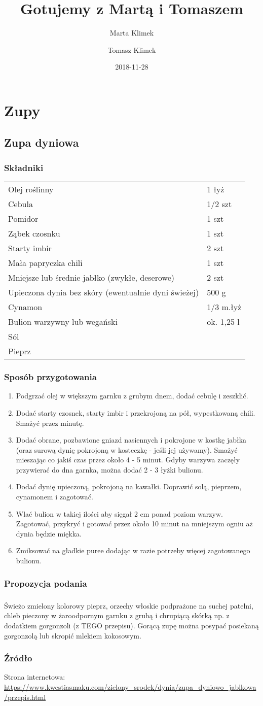 \documentclass{book}
\title{Gotujemy z Martą i Tomaszem}
\date{2018-11-28}
\author{
	Marta Klimek
	\and
	Tomasz Klimek
}
\newcommand{\skladniki}[1]{\subsection*{Składniki}
	\begin{tabular}{ll}
		#1
	\end{tabular}
}
\newcommand{\skladnik}[3]{#3&#1 #2\\}
\newcommand{\sztuk}[2]{\skladnik{#1}{szt}{#2}}
\newcommand{\gram}[2]{\skladnik{#1}{g}{#2}}
\newcommand{\litr}[2]{\skladnik{#1}{l}{#2}}
\newcommand{\lyzka}[2]{\skladnik{#1}{łyż}{#2}}
\newcommand{\lyzeczka}[2]{\skladnik{#1}{m.łyż}{#2}}
\newcommand{\przyprawa}[1]{\skladnik{}{}{#1}}
\newcommand{\przygotowanie}[1]{\subsection*{Sposób przygotowania}
	\begin{enumerate}
		#1
	\end{enumerate}
}
\newcommand{\krok}[1]{\item #1}
\newcommand{\podanie}[1]{\subsection*{Propozycja podania}#1}
\newcommand{\zrodlo}[1]{\subsection*{Źródło}#1}
\newcommand{\link}[1]{Strona internetowa: \url{#1}}
\begin{document}
	\maketitle
	\tableofcontents

	\chapter{Zupy}
		\newpage
		
		\section{Zupa dyniowa}
			\skladniki{
				\lyzka{1}{Olej roślinny}
				\sztuk{1/2}{Cebula}
				\sztuk{1}{Pomidor}
				\sztuk{1}{Ząbek czosnku}
				\sztuk{2}{Starty imbir}
				\sztuk{1}{Mała papryczka chili}
				\sztuk{2}{Mniejsze lub średnie jabłko (zwykłe, deserowe)}
				\gram{500}{Upieczona dynia bez skóry (ewentualnie dyni świeżej)}
				\lyzeczka{1/3}{Cynamon}
				\litr{ok. 1,25}{Bulion warzywny lub wegański}
				\przyprawa{Sól}
				\przyprawa{Pieprz}
			}
			\przygotowanie{
				\krok{Podgrzać olej w większym garnku z grubym dnem, dodać cebulę i zeszklić.}
				\krok{Dodać starty czosnek, starty imbir i przekrojoną na pół, wypestkowaną chili. Smażyć przez minutę.}
				\krok{Dodać obrane, pozbawione gniazd nasiennych i pokrojone w kostkę jabłka (oraz 	surową dynię pokrojoną w kosteczkę - jeśli jej używamy). Smażyć mieszając co jakiś czas przez około 4 - 5 minut. Gdyby warzywa zaczęły przywierać do dna garnka, można dodać 	2 - 3 łyżki bulionu.}
				\krok{Dodać dynię upieczoną, pokrojoną na kawałki. Doprawić solą, pieprzem, cynamonem i zagotować.}
				\krok{Wlać bulion w takiej ilości aby sięgał 2 cm ponad poziom warzyw. Zagotować, 	przykryć i gotować przez około 10 minut na mniejszym ogniu aż dynia będzie miękka.}
				\krok{Zmiksować na gładkie puree dodając w razie potrzeby więcej zagotowanego bulionu.}
			}
			\podanie{
				\paragraph{}Świeżo zmielony kolorowy pieprz, orzechy włoskie podprażone na suchej patelni, chleb pieczony w żaroodpornym garnku z grubą i chrupiącą skórką np. z dodatkiem gorgonzoli (z TEGO przepisu). Gorącą zupę można posypać posiekaną gorgonzolą lub skropić mlekiem kokosowym.
			}
			\zrodlo{\link{https://www.kwestiasmaku.com/zielony_srodek/dynia/zupa_dyniowo_jablkowa/przepis.html}}
			\newpage
	
\end{document}

